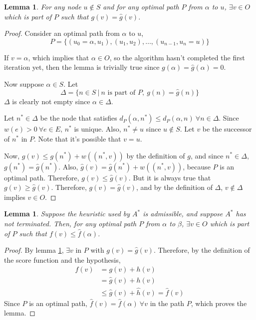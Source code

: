 \documentclass[12pt]{report}
\newtheorem{lemma}[theorem]{Lemma}
\begin{document}
\begin{lemma}
\label{lemma:astar1}
 For any node $u \not \in S$ and for any optimal path $P$ from $\alpha$ to $u$, $\exists v \in O$ which is part of $P$ such that $g(v) = \hat{g}(v)$.
\end{lemma}
\begin{proof}
Consider an optimal path from $\alpha$ to $u$,
\[P = \{ (u_0 = \alpha, u_1), (u_1, u_2), \dots, (u_{n-1}, u_n = u) \}\]

If $v = \alpha$, which implies that $\alpha \in O$, so the algorithm hasn't completed the first iteration yet, then the lemma is trivially true since $g(\alpha) = \hat{g}(\alpha) = 0$.

Now suppose $\alpha \in S$. Let
\[ \Delta = \{ n \in S \  | \  n \text{ is part of } P,\  g(n) = \hat{g}(n) \} \]
$\Delta$ is clearly not empty since $\alpha \in \Delta$.

Let $n^* \in \Delta$ be the node that satisfies $d_P(\alpha, n^*) \leq d_P(\alpha, n) \  \forall n \in \Delta$. Since $w(e) > 0\  \forall e \in E$, $n^*$ is unique. Also, $n^* \neq u$ since $u \not \in S$. Let $v$ be the successor of $n^*$ in $P$. Note that it's possible that $v = u$.

Now, $g(v) \leq g(n^*) + w((n^*, v))$ by the definition of $g$, and since $n^* \in \Delta$, $g(n^*) = \hat{g}(n^*)$. Also, $\hat{g}(v) = \hat{g}(n^*) + w((n^*, v))$, because $P$ is an optimal path. Therefore, $g(v) \leq \hat{g}(v)$. But it is always true that $g(v) \geq \hat{g}(v)$. Therefore, $g(v) = \hat{g}(v)$, and by the definition of $\Delta$, $v \not \in \Delta$ implies $v \in O$.
\end{proof}

\begin{lemma}
\label{lemma:astar2}
Suppose the heuristic used by $A^*$ is admissible, and suppose $A^*$ has not terminated. Then, for any optimal path $P$ from $\alpha$ to $\beta$, $\exists v \in O$ which is part of $P$ such that $f(v) \leq \hat{f}(\alpha)$.
\end{lemma}
\begin{proof}
By lemma \ref{lemma:astar1}, $\exists v$ in $P$ with $g(v) = \hat{g}(v)$. Therefore, by the definition of the score function and the hypothesis,
\begin{align*}
f(v) &= g(v) + h(v)\\
&= \hat{g}(v) + h(v)\\
&\leq \hat{g}(v) + \hat{h}(v) = \hat{f}(v)
\end{align*}
Since $P$ is an optimal path, $\hat{f}(v) = \hat{f}(\alpha) \  \forall v$ in the path $P$, which proves the lemma.
\end{proof}
\end{document}
